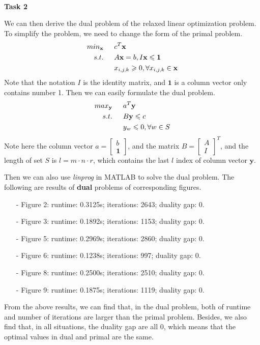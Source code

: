 \documentclass[12pt,a4paper]{article}
\begin{document}
~\\
\normalsize \textbf{Task 2}\\ 
\par We can then derive the dual problem of the relaxed linear optimization problem. To simplify the problem, we need to change the form of the primal problem.
\begin{equation*}
\begin{aligned}
min_{\textbf{x}}\indent& c^{T}\textbf{x}\\
s.t.\indent& A\textbf{x}=b, I\textbf{x} \leqslant \bm{1}\\
& x_{i,j,k} \geqslant 0, \forall x_{i,j,k}\in \textbf{x}\\
\end{aligned}
\end{equation*}
Note that the notation $I$ is the identity matrix, and $\bm{1}$ is a column vector only contains number 1. Then we can easily formulate the dual problem.
\begin{equation*}
\begin{aligned}
max_{\textbf{y}}\indent& a^{T}\textbf{y}\\
s.t.\indent& B\textbf{y} \leqslant c\\
& y_{w} \leqslant 0, \forall w\in S\\
\end{aligned}
\end{equation*}
Note here the column vector $a =\begin{bmatrix}
b\\\bm{1}
\end{bmatrix}$, and the matrix $B =\begin{bmatrix}
A\\I
\end{bmatrix}^{T}$, and the length of set $S$ is $l =m\cdot n\cdot r$, which contains the last $l$ index of column vector $\textbf{y}$.\\

\par Then we can also use \textit{linprog} in MATLAB to solve the dual problem. The following are results of \textbf{dual} problems of corresponding figures.
\begin{itemize}
	\item[-] Figure 2: runtime: 0.3125s;\; iterations: 2643;\; duality gap: 0.
	\item[-] Figure 3: runtime: 0.1892s;\; iterations: 1153;\; duality gap: 0.
	\item[-] Figure 5: runtime: 0.2969s;\; iterations: 2860;\; duality gap: 0.
	\item[-] Figure 6: runtime: 0.1238s;\; iterations: 997;\; duality gap: 0.
	\item[-] Figure 8: runtime: 0.2500s;\; iterations: 2510;\; duality gap: 0.
	\item[-] Figure 9: runtime: 0.1875s;\; iterations: 1119;\; duality gap: 0.
\end{itemize}
\par From the above results, we can find that, in the dual problem, both of runtime and number of iterations are larger than the primal problem. Besides, we also find that, in all situations, the duality gap are all 0, which means that the optimal values in dual and primal are the same.
\end{document}
